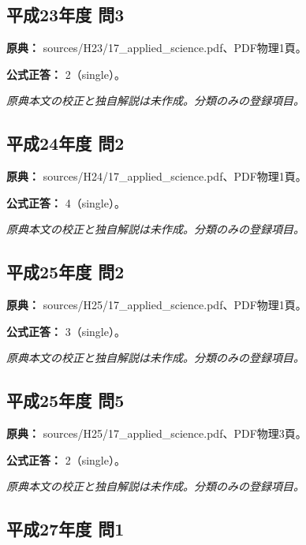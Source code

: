 \subsection{平成23年度 問3}
\label{q:h23-reg-applied-03}

\noindent\textbf{原典：} sources/H23/17\_applied\_science.pdf、PDF物理1頁。

\textbf{公式正答：} 2（single）。

\par\textit{原典本文の校正と独自解説は未作成。分類のみの登録項目。}

\subsection{平成24年度 問2}
\label{q:h24-reg-applied-02}

\noindent\textbf{原典：} sources/H24/17\_applied\_science.pdf、PDF物理1頁。

\textbf{公式正答：} 4（single）。

\par\textit{原典本文の校正と独自解説は未作成。分類のみの登録項目。}

\subsection{平成25年度 問2}
\label{q:h25-reg-applied-02}

\noindent\textbf{原典：} sources/H25/17\_applied\_science.pdf、PDF物理1頁。

\textbf{公式正答：} 3（single）。

\par\textit{原典本文の校正と独自解説は未作成。分類のみの登録項目。}

\subsection{平成25年度 問5}
\label{q:h25-reg-applied-05}

\noindent\textbf{原典：} sources/H25/17\_applied\_science.pdf、PDF物理3頁。

\textbf{公式正答：} 2（single）。

\par\textit{原典本文の校正と独自解説は未作成。分類のみの登録項目。}

\subsection{平成27年度 問1}
\label{q:h27-reg-applied-01}

